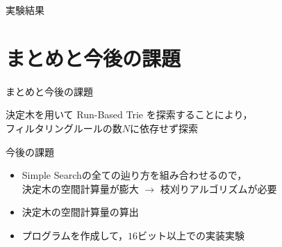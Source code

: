 \documentclass[12pt,dvipdfmx,mathserif,uplatex,aspectratio=32]{beamer}
\begin{document}
\begin{frame}{実験結果}
\end{frame}


\section{まとめと今後の課題}
\begin{frame}{まとめと今後の課題}

\begin{center}
決定木を用いて Run-Based Trie を探索することにより，\\
\vspace{3mm}
フィルタリングルールの数$N$に依存せず探索
\end{center}

 \par
 \vspace{10mm}


 {\large 今後の課題}

 \vspace{3mm}
 \begin{itemize}
  \item Simple Searchの全ての辿り方を組み合わせるので，\\ 
決定木の空間計算量が膨大 $\rightarrow$ 枝刈りアルゴリズムが必要
  \vspace{3mm}
  \item 決定木の空間計算量の算出
  \vspace{3mm}
  \item プログラムを作成して，$16$ビット以上での実装実験
 \end{itemize}

\end{frame}

%
%  
%  
%
\end{document}

